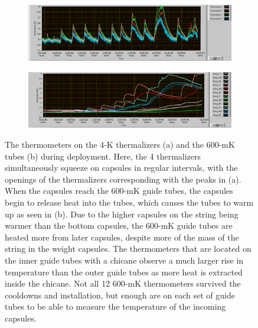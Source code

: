\begin{figure}[htbp]
\centering
\begin{subfigure}[t]{0.9\textwidth}
\centering
\includegraphics[width=\textwidth]{Figures/Thermalizer_operation.png}
\caption{}
\label{fig:4K_operation}
\end{subfigure}
\qquad
\begin{subfigure}[t]{0.9\textwidth}
\centering
\includegraphics[width=\textwidth]{Figures/Chicane_operation.png}
\caption{}
\label{fig:Chicane_operation}
\end{subfigure}
\caption[The thermometers on the 4-K thermalizers (a) and the 600-mK tubes (b) during a deployment]
{The thermometers on the 4-K thermalizers (a) and the 600-mK tubes (b) during deployment.
Here, the 4 thermalizers simultaneously squeeze on capsules in regular intervals, with the openings of the thermalizers corresponding with the peaks in (a).
When the capsules reach the 600-mK guide tubes, the capsules begin to release heat into the tubes, which causes the tubes to warm up as seen in (b).
Due to the higher capsules on the string being warmer than the bottom capsules, the 600-mK guide tubes are heated more from later capsules, despite more of the mass of the string in the weight capsules.
The thermometers that are located on the inner guide tubes with a chicane observe a much larger rise in temperature than the outer guide tubes as more heat is extracted inside the chicane.
Not all 12 600-mK thermometers survived the cooldowns and installation, but enough are on each set of guide tubes to be able to measure the temperature of the incoming capsules.}
\label{fig:Thermalization_operation}
\end{figure}

